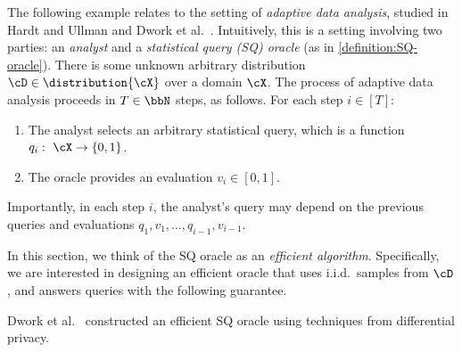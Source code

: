 \documentclass{toc}
\begin{document}
The following example relates to the setting of \emph{adaptive data analysis}, studied in Hardt and Ullman \cite{DBLP:conf/focs/HardtU14} and Dwork et al.\ \cite{DBLP:conf/stoc/DworkFHPRR15}. Intuitively, this is a setting involving two parties: an \emph{analyst} and a \emph{statistical query (SQ) oracle} (as in \cref{definition:SQ-oracle}). There is some unknown arbitrary distribution $\cD \in \distribution{\cX}$ over a domain $\cX$. The process of adaptive data analysis proceeds in $T \in \bbN$ steps, as follows. For each step $i \in [T]$:
\begin{enumerate}
	\item{
		The analyst selects an arbitrary statistical query, which is a function $q_i: ~ \cX \to \{0,1\}$.
	}
	\item{
		The oracle provides an evaluation $v_i \in [0,1]$.
	}
\end{enumerate}
Importantly, in each step $i$, the analyst's query may depend on the previous queries and evaluations $q_1,v_1,\dots,q_{i-1},v_{i-1}$. 

In this section, we think of the SQ oracle as an \emph{efficient algorithm}. Specifically, we are interested in designing an efficient oracle that uses i.i.d.\ samples from $\cD$, and answers queries with the following guarantee.


Dwork et al.\ \cite{DBLP:conf/stoc/DworkFHPRR15} constructed an efficient SQ oracle using techniques from differential privacy.

\end{document}

